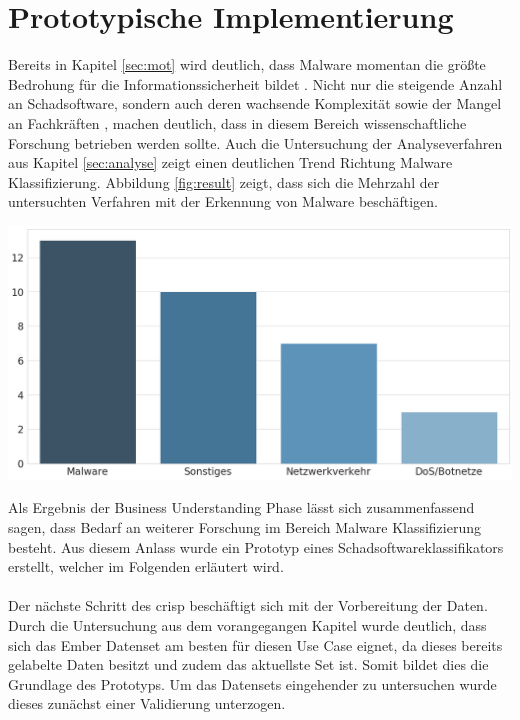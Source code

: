 \documentclass[
    12pt, %
    DIV10,
    ngerman, %
    a4paper, %
    oneside, %
    titlepage, %
    parskip=half, %
    headings=normal, %
    listof=totoc, %
    bibliography=totoc, %
    index=totoc, %
    captions=tableheading, %
    final %
]{scrreprt}
\begin{document}
\chapter{Prototypische Implementierung}
Bereits in Kapitel \ref{sec:mot} wird deutlich, dass Malware momentan die grö{\ss}te Bedrohung für die Informationssicherheit bildet \parencite{JoshuaSaxe2018}. Nicht nur die steigende Anzahl an Schadsoftware, sondern auch deren wachsende Komplexität \parencite{he2017model} sowie der Mangel an Fachkräften \parencite{Evans2010}, machen deutlich, dass in diesem Bereich wissenschaftliche Forschung betrieben werden sollte. Auch die Untersuchung der Analyseverfahren aus Kapitel \ref{sec:analyse} zeigt einen deutlichen Trend Richtung Malware Klassifizierung. Abbildung \ref{fig:result} zeigt, dass sich die Mehrzahl der untersuchten Verfahren mit der Erkennung von Malware beschäftigen. 
\begin{center}
\includegraphics[scale=0.3]{img/res.png}
\label{fig:result}
\end{center}
Als Ergebnis der Business Understanding Phase lässt sich zusammenfassend sagen, dass Bedarf an weiterer Forschung im Bereich Malware Klassifizierung besteht.
Aus diesem Anlass wurde ein Prototyp eines Schadsoftwareklassifikators erstellt, welcher im Folgenden erläutert wird.
\\\\
Der nächste Schritt des \ac{crisp} beschäftigt sich mit der Vorbereitung der Daten. Durch die Untersuchung aus dem vorangegangen Kapitel wurde deutlich, dass sich das Ember Datenset am besten für diesen Use Case eignet, da dieses bereits gelabelte Daten besitzt und zudem das aktuellste Set ist. Somit bildet dies die Grundlage des Prototyps. Um das Datensets eingehender zu untersuchen wurde dieses zunächst einer Validierung unterzogen.\\
\end{document}
